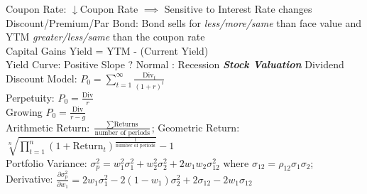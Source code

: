 \documentclass{letter}
\newcommand{\textib}[1]{\textit{\textbf{{#1}}}}
\begin{document}
Coupon Rate: $\downarrow$Coupon Rate $\implies$ Sensitive to Interest Rate changes \\
Discount/Premium/Par Bond: Bond sells for \textit{less/more/same} than face value and YTM 
\textit{greater/less/same} than the coupon rate \\
Capital Gains Yield = YTM - (Current Yield) \\
Yield Curve: Positive Slope ? Normal : Recession
\newline
\textib{Stock Valuation}
Dividend Discount Model: $P_0 = \sum\limits_{t = 1}^{\infty} \frac{\text{Div}_{t}}{\left(1 + r\right)^{t}}$ \\
Perpetuity: $P_0 = \frac{\text{Div}}{r}$ \\
Growing $P_0 = \frac{\text{Div}}{r - g}$ \\
Arithmetic Return: $\frac{\sum \text{Returns}}{\text{number of periods}}$;
Geometric Return: $\sqrt[n]{\prod\limits_{t = 1}^{n} \left(1 + \text{Return}_{t} \right)^{\frac{1}{\text{number of periods}}}} - 1$ \\
Portfolio Variance: $\sigma^{2}_{p} = w^{2}_{1}\sigma^{2}_{1} + w^{2}_{2}\sigma^{2}_{2} + 2w_{1}w_{2}\sigma^{2}_{12}$ where $\sigma_{12} = \rho_{12}\sigma_{1}\sigma_{2}$;
Derivative: $\frac{\partial \sigma_p^2}{\partial w_1} = 2w_1 \sigma_1^2 - 2(1 - w_1) \sigma_2^2 + 2\sigma_{12} - 2w_1 \sigma_{12}$
\end{document}
